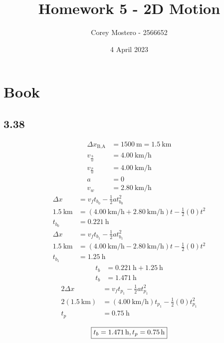 \documentclass{article}
\title{Homework 5 - 2D Motion}
\author{Corey Mostero - 2566652}
\date{4 April 2023}
\begin{document}
\newcommand{\hr}{\par\noindent\rule{\textwidth}{0.4pt}}

\newcommand{\bc}[1]{
	\begin{equation*}
		\begin{boxed}
			{#1}
		\end{boxed}
	\end{equation*}
}

\newcommand{\cond}[2]{
	\ifmmode
		{#1} \quad {#2}
	\else
		$$ {#1} \quad {#2} $$
	\fi
}

\maketitle
\newpage

\tableofcontents

\section{Book}

\subsection{3.38}
\begin{align*}
	\Delta x_\text{B,A} & = \SI{1500}{\meter} = \SI{1.5}{\kilo \meter} \\
	v_\frac{b}{w} & = \SI{4.00}{\kilo \meter \per \hour} \\
	v_\frac{p}{w} & = \SI{4.00}{\kilo \meter \per \hour} \\
	a & = 0 \\
	v_w & = \SI{2.80}{\kilo \meter \per \hour}
\end{align*}
\begin{align*}
	\Delta x & = v_ft_{b_0} - \frac{1}{2}at_{b_0}^2 \\
	\SI{1.5}{\kilo \meter} & = (\SI{4.00}{\kilo \meter \per \hour} + \SI{2.80}{\kilo \meter \per \hour})t - \frac{1}{2}(0)t^2 \\
	t_{b_0} & = \SI{0.221}{\hour}
\end{align*}
\begin{align*}
	\Delta x & = v_ft_{b_1} - \frac{1}{2}at_{b_1}^2 \\
	\SI{1.5}{\kilo \meter} & = (\SI{4.00}{\kilo \meter \per \hour} - \SI{2.80}{\kilo \meter \per \hour})t - \frac{1}{2}(0)t^2 \\
	t_{b_1} & = \SI{1.25}{\hour}
\end{align*}
\begin{align*}
	t_b & = \SI{0.221}{\hour} + \SI{1.25}{\hour} \\
	t_b & = \SI{1.471}{\hour}
\end{align*}
\begin{align*}
	2\Delta x & = v_ft_{p_1} - \frac{1}{2}at_{p_1}^2 \\
	2(\SI{1.5}{\kilo \meter}) & = (\SI{4.00}{\kilo \meter \per \hour})t_{p_1} - \frac{1}{2}(0)t_{p_1}^2 \\
	t_p & = \SI{0.75}{\hour}
\end{align*}
\bc{t_b = \SI{1.471}{\hour}, t_p = \SI{0.75}{\hour}}
\end{document}
